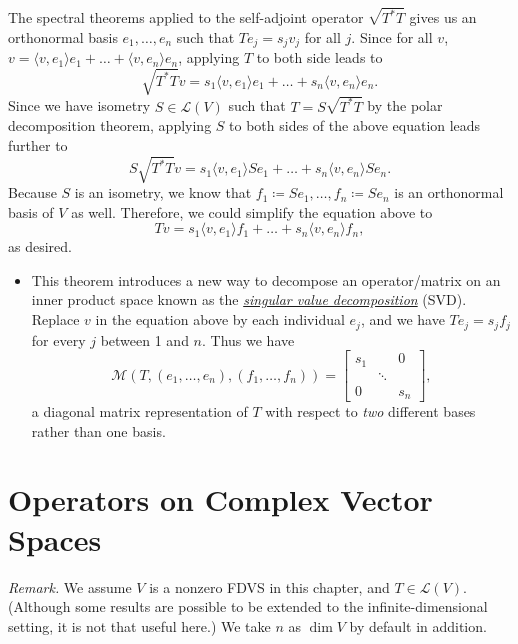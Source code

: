 \documentclass{article}
\newcommand{\df}[1]{\ul{\textit{#1}}}
\renewcommand{\d}{\dim}
\newcommand{\inp}[2]{\langle #1, #2 \rangle}
\newcommand{\LV}{\mathcal{L}(V)}
\newcommand{\M}{\mathcal{M}}
\begin{document}
\begin{itemize}
The spectral theorems applied to the self-adjoint operator $\sqrt{T^*T}$ gives us an orthonormal basis $e_1,\dots,e_n$ such that $Te_j = s_j v_j$ for all $j$. Since for all $v$, $v = \inp{v}{e_1}e_1 + \dots + \inp{v}{e_n}e_n$, applying $T$ to both side leads to $$\sqrt{T^*T}v = s_1\inp{v}{e_1}e_1 + \dots + s_n\inp{v}{e_n}e_n.$$ Since we have isometry $S \in \LV$ such that $T = S \sqrt{T^*T}$ by the polar decomposition theorem, applying $S$ to both sides of the above equation leads further to $$S\sqrt{T^*T}v = s_1\inp{v}{e_1}Se_1 + \dots + s_n\inp{v}{e_n}Se_n.$$ Because $S$ is an isometry, we know that $f_1 \coloneqq Se_1,\dots,f_n \coloneqq Se_n$ is an orthonormal basis of $V$ as well. Therefore, we could simplify the equation above to $$Tv = s_1 \inp{v}{e_1}f_1 + \dots + s_n \inp{v}{e_n}f_n,$$ as desired.
\begin{itemize}
	\item This theorem introduces a new way to decompose an operator/matrix on an inner product space known as the \df{singular value decomposition} (SVD). Replace $v$ in the equation above by each individual $e_j$, and we have $Te_j = s_jf_j$ for every $j$ between 1 and $n$. Thus we have
	\begin{equation*}
		\M(T,(e_1,\dots,e_n),(f_1,\dots,f_n)) = \begin{bmatrix}
		s_1 & & 0 \\
		 & \ddots & \\
		 0 & & s_n
		\end{bmatrix},
	\end{equation*}
a diagonal matrix representation of $T$ with respect to \emph{two} different bases rather than one basis.
\end{itemize}
\end{itemize}


\newpage
\section{Operators on Complex Vector Spaces}
\textit{Remark.} We assume $V$ is a nonzero FDVS in this chapter, and $T \in \LV$. (Although some results are possible to be extended to the infinite-dimensional setting, it is not that useful here.) We take $n$ as $\d V$ by default in addition.
\end{document}
